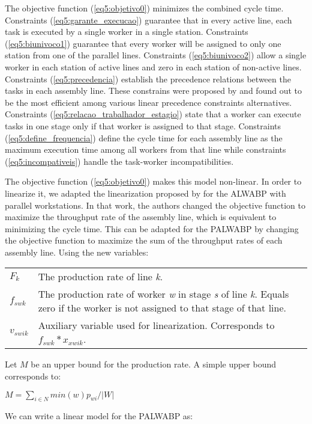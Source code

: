 \documentclass{singlecol-new}
\begin{document}
The objective function (\ref{eq5:objetivo0}) minimizes the combined cycle time. Constraints (\ref{eq5:garante_execucao}) guarantee that in every active line, each task is executed by a single worker in a single station. Constraints (\ref{eq5:biunivoco1}) guarantee that every worker will be assigned to only one station from one of the parallel lines. Constraints (\ref{eq5:biunivoco2}) allow a single worker in each station of active lines and zero in each station of non-active lines. Constraints (\ref{eq5:precedencia}) establish the precedence relations between the tasks in each assembly line. These constrains were proposed by \cite{Ritt2011} and found out to be the most efficient among various linear precedence constraints alternatives. Constraints (\ref{eq5:relacao_trabalhador_estagio}) state that a worker can execute tasks in one stage only if that worker is assigned to that stage.  Constraints (\ref{eq5:define_frequencia}) define the cycle time for each assembly line as the maximum execution time among all workers from that line while constraints (\ref{eq5:incompativeis}) handle the task-worker incompatibilities.

The objective function (\ref{eq5:objetivo0}) makes this model non-linear. In order to linearize it, we adapted the linearization proposed by \cite{araujo12two} for the ALWABP with parallel workstations. In that work, the authors changed the objective function to maximize the throughput rate of the assembly line, which is equivalent to minimizing the cycle time. This can be adapted for the PALWABP by changing the objective function to maximize the sum of the throughput rates of each assembly line. Using the new variables:

\begin{tabular}[t]{lp{10cm}}
$F_{k}$ & The production rate of line \textit{k}.\\
$f_{swk}$ & The production rate of worker \textit{w} in stage \textit{s} of line \textit{k}. Equals zero if the worker is not assigned to that stage of that line.\\
$v_{swik}$ & Auxiliary variable used for linearization. Corresponds to $f_{swk}*x_{xwik}$.\\ 
\end{tabular}

Let $M$ be an upper bound for the production rate. A simple upper bound corresponds to:

$M = \sum_{i \in N} min(w)p_{wi}/|W|$

We can write a linear model for the PALWABP as:
\end{document}
